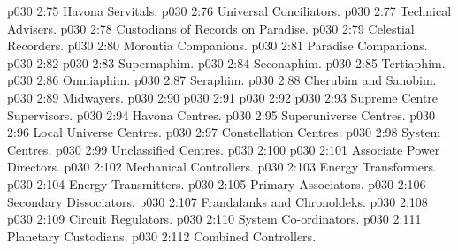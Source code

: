 \vs p030 2:75 \bibnobreakspace Havona Servitals.
\vs p030 2:76 \bibnobreakspace Universal Conciliators.
\vs p030 2:77 \bibnobreakspace Technical Advisers.
\vs p030 2:78 \bibnobreakspace Custodians of Records on Paradise.
\vs p030 2:79 \bibnobreakspace Celestial Recorders.
\vs p030 2:80 \bibnobreakspace Morontia Companions.
\vs p030 2:81 \bibnobreakspace Paradise Companions.
\vs p030 2:82 \bibnobreakspace {}
\vs p030 2:83 \bibnobreakspace Supernaphim.
\vs p030 2:84 \bibnobreakspace Seconaphim.
\vs p030 2:85 \bibnobreakspace Tertiaphim.
\vs p030 2:86 \bibnobreakspace Omniaphim.
\vs p030 2:87 \bibnobreakspace Seraphim.
\vs p030 2:88 \bibnobreakspace Cherubim and Sanobim.
\vs p030 2:89 \bibnobreakspace Midwayers.
\vs p030 2:90 \bibnobreakspace {}
\vs p030 2:91 \bibnobreakspace {}
\vs p030 2:92 \bibnobreakspace {}
\vs p030 2:93 \bibnobreakspace Supreme Centre Supervisors.
\vs p030 2:94 \bibnobreakspace Havona Centres.
\vs p030 2:95 \bibnobreakspace Superuniverse Centres.
\vs p030 2:96 \bibnobreakspace Local Universe Centres.
\vs p030 2:97 \bibnobreakspace Constellation Centres.
\vs p030 2:98 \bibnobreakspace System Centres.
\vs p030 2:99 \bibnobreakspace Unclassified Centres.
\vs p030 2:100 \bibnobreakspace {}
\vs p030 2:101 \bibnobreakspace Associate Power Directors.
\vs p030 2:102 \bibnobreakspace Mechanical Controllers.
\vs p030 2:103 \bibnobreakspace Energy Transformers.
\vs p030 2:104 \bibnobreakspace Energy Transmitters.
\vs p030 2:105 \bibnobreakspace Primary Associators.
\vs p030 2:106 \bibnobreakspace Secondary Dissociators.
\vs p030 2:107 \bibnobreakspace Frandalanks and Chronoldeks.
\vs p030 2:108 \bibnobreakspace {}
\vs p030 2:109 \bibnobreakspace Circuit Regulators.
\vs p030 2:110 \bibnobreakspace System Co\hyp{}ordinators.
\vs p030 2:111 \bibnobreakspace Planetary Custodians.
\vs p030 2:112 \bibnobreakspace Combined Controllers.
